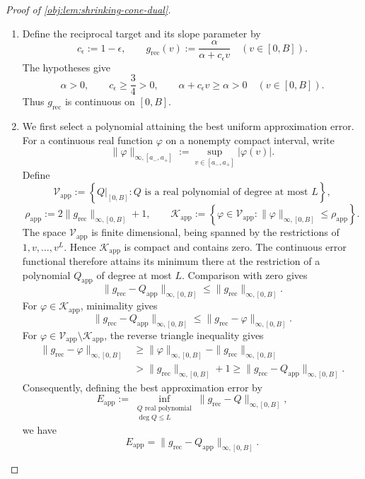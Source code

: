 \documentclass[11pt]{article}
\begin{document}
\begin{proof}[Proof of \cref{obj:lem:shrinking-cone-dual}]
\begin{enumerate}
\item Define the reciprocal target and its slope parameter by
\[
c_\epsilon:=1-\epsilon,
\qquad
g_{\mathrm{rec}}(v):=\frac{\alpha}{\alpha+c_\epsilon v}
\quad (v\in[0,B]).
\]
The hypotheses give
\[
\alpha>0,
\qquad
c_\epsilon\ge\frac34>0,
\qquad
\alpha+c_\epsilon v\ge\alpha>0
\quad (v\in[0,B]).
\]
Thus \(g_{\mathrm{rec}}\) is continuous on \([0,B]\). %

\item We first select a polynomial attaining the best uniform approximation error. For a continuous real function \(\varphi\) on a nonempty compact interval, write
\[
\|\varphi\|_{\infty,[a_-,a_+]}
:=
\sup_{v\in[a_-,a_+]}|\varphi(v)|.
\]
Define
\[
\mathcal V_{\mathrm{app}}
:=
\left\{
Q|_{[0,B]}:
Q\text{ is a real polynomial of degree at most }L
\right\},
\]
\[
\rho_{\mathrm{app}}
:=
2\|g_{\mathrm{rec}}\|_{\infty,[0,B]}+1,
\qquad
\mathcal K_{\mathrm{app}}
:=
\left\{
\varphi\in\mathcal V_{\mathrm{app}}:
\|\varphi\|_{\infty,[0,B]}\le\rho_{\mathrm{app}}
\right\}.
\]
The space \(\mathcal V_{\mathrm{app}}\) is finite dimensional, being spanned by the restrictions of \(1,v,\ldots,v^L\). Hence \(\mathcal K_{\mathrm{app}}\) is compact and contains zero. The continuous error functional therefore attains its minimum there at the restriction of a polynomial \(Q_{\mathrm{app}}\) of degree at most \(L\). Comparison with zero gives
\[
\|g_{\mathrm{rec}}-Q_{\mathrm{app}}\|_{\infty,[0,B]}
\le
\|g_{\mathrm{rec}}\|_{\infty,[0,B]}.
\]
For \(\varphi\in\mathcal K_{\mathrm{app}}\), minimality gives
\[
\|g_{\mathrm{rec}}-Q_{\mathrm{app}}\|_{\infty,[0,B]}
\le
\|g_{\mathrm{rec}}-\varphi\|_{\infty,[0,B]}.
\]
For \(\varphi\in\mathcal V_{\mathrm{app}}\setminus\mathcal K_{\mathrm{app}}\), the reverse triangle inequality gives
\[
\begin{aligned}
\|g_{\mathrm{rec}}-\varphi\|_{\infty,[0,B]}
&\ge
\|\varphi\|_{\infty,[0,B]}
-\|g_{\mathrm{rec}}\|_{\infty,[0,B]}\\
&>
\|g_{\mathrm{rec}}\|_{\infty,[0,B]}+1
\ge
\|g_{\mathrm{rec}}-Q_{\mathrm{app}}\|_{\infty,[0,B]}.
\end{aligned}
\]
Consequently, defining the best approximation error by
\[
E_{\mathrm{app}}
:=
\inf_{\substack{Q\text{ real polynomial}\\ \deg Q\le L}}
\|g_{\mathrm{rec}}-Q\|_{\infty,[0,B]},
\]
we have
\[
E_{\mathrm{app}}
=
\|g_{\mathrm{rec}}-Q_{\mathrm{app}}\|_{\infty,[0,B]}.
\]


\end{enumerate}
\end{proof}
\end{document}

